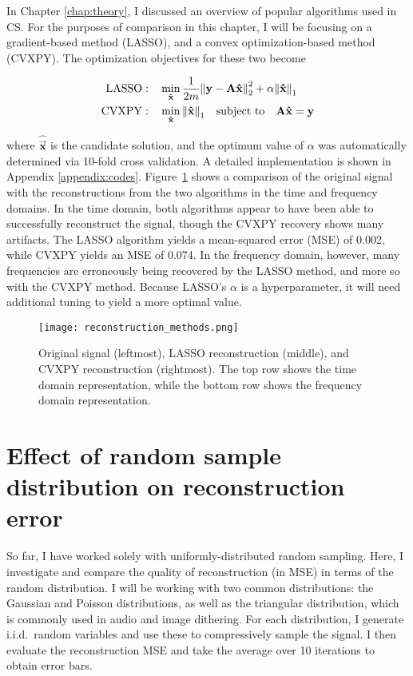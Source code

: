 In Chapter \ref{chap:theory}, I discussed an overview of popular algorithms used in CS. For the purposes of comparison in this chapter, I will be focusing on a gradient-based method (LASSO), and a convex optimization-based method (CVXPY). The optimization objectives for these two become

\begin{align}
	\mathrm{LASSO}:& \quad \min_{\bm\hat{\text{\bfseries x}}} \frac{1}{2m} \norm{\text{\bfseries y} - \text{\bfseries A}\bm\hat{\text{\bfseries x}}}_2^2 + \alpha \norm{\bm\hat{\text{\bfseries x}}}_1 \label{eq:random-lasso-objective} \\
	\mathrm{CVXPY}:& \quad \min_{\bm\hat{\text{\bfseries x}}} \norm{\bm\hat{\text{\bfseries x}}}_1 \quad \textrm{subject to} \quad \text{\bfseries A}\bm\hat{\text{\bfseries x}} = \text{\bfseries y} \label{eq:random-cvxpy-objective}
\end{align}

where $\bm\hat{\vec{x}}$ is the candidate solution, and the optimum value of $\alpha$ was automatically determined via 10-fold cross validation. A detailed implementation is shown in Appendix \ref{appendix:codes}. Figure~\ref{fig:random-compare-algorithms} shows a comparison of the original signal with the reconstructions from the two algorithms in the time and frequency domains. In the time domain, both algorithms appear to have been able to successfully reconstruct the signal, though the CVXPY recovery shows many artifacts. The LASSO algorithm yields a mean-squared error (MSE) of 0.002, while CVXPY yields an MSE of 0.074. In the frequency domain, however, many frequencies are erroneously being recovered by the LASSO method, and more so with the CVXPY method. Because LASSO's $\alpha$ is a hyperparameter, it will need additional tuning to yield a more optimal value.

\begin{figure}[htb]
	\texttt{[image: reconstruction\_methods.png]}
	\caption{Original signal (leftmost), LASSO reconstruction (middle), and CVXPY reconstruction (rightmost). The top row shows the time domain representation, while the bottom row shows the frequency domain representation.}
	\label{fig:random-compare-algorithms}
\end{figure}


\section{Effect of random sample distribution on reconstruction error}
So far, I have worked solely with uniformly-distributed random sampling. Here, I investigate and compare the quality of reconstruction (in MSE) in terms of the random distribution. I will be working with two common distributions: the Gaussian and Poisson distributions, as well as the triangular distribution, which is commonly used in audio and image dithering. For each distribution, I generate i.i.d.~random variables and use these to compressively sample the signal. I then evaluate the reconstruction MSE and take the average over 10 iterations to obtain error bars.

